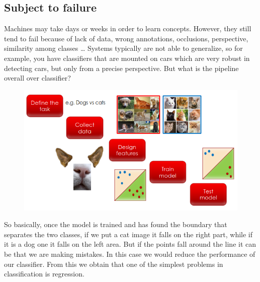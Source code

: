 \subsection{Subject to failure}
Machines may take days or weeks in order to learn concepts. However, they still tend to fail because of lack of data, wrong annotations, occlusions, perspective, similarity among classes \dots
Systems typically are not able to generalize, so for example, you have classifiers that are mounted on cars which are very robust in detecting cars, but only from a precise perspective.
But what is the pipeline overall over classifier?
\begin{figure}[h]
    \centering
    \includegraphics[scale=0.6]{Figures/PipelineClassifier.png}
\end{figure}
So basically, once the model is trained and has found the boundary that separates the two classes, if we put a cat image it falls on the right part, while if it is a dog one it falls on the left area. But if the points fall around the line it can be that we are making mistakes.
In this case we would reduce the performance of our classifier. From this we obtain that one of the simplest problems in classification is regression.
